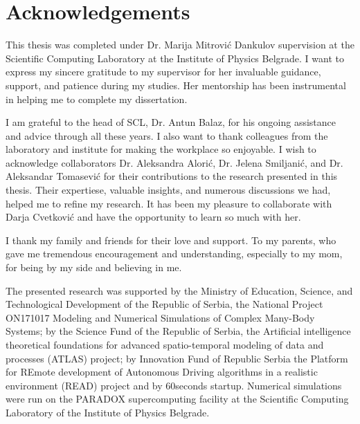 
\normalsize
\chapter{Acknowledgements}

This thesis was completed under Dr. Marija Mitrović Dankulov supervision at the Scientific Computing Laboratory at the Institute of Physics Belgrade. I want to express my sincere gratitude to my supervisor for her invaluable guidance, support, and patience during my studies. Her mentorship has been instrumental in helping me to complete my dissertation.  

I am grateful to the head of SCL, Dr. Antun Balaz, for his ongoing assistance and advice through all these years. I also want to thank colleagues from the laboratory and institute for making the workplace so enjoyable. I wish to acknowledge collaborators Dr. Aleksandra Alorić, Dr. Jelena Smiljanić, and Dr. Aleksandar Tomasević for their contributions to the research presented in this thesis. Their expertiese, valuable insights, and numerous discussions we had, helped me to refine my research. It has been my pleasure to collaborate with Darja Cvetković and have the opportunity to learn so much with her.

I thank my family and friends for their love and support. To my parents, who gave me tremendous encouragement and understanding, especially to my mom, for being by my side and believing in me.

The presented research was supported by the Ministry of Education, Science, and Technological Development of the Republic of Serbia, the National Project ON171017 Modeling and Numerical Simulations of Complex Many-Body Systems; by the Science Fund of the Republic of Serbia, the Artificial intelligence theoretical foundations for advanced spatio-temporal modeling of data and processes (ATLAS) project; by Innovation Fund of Republic Serbia the Platform for REmote development of Autonomous Driving algorithms in a realistic environment (READ) project and by 60seconds startup. Numerical simulations were run on the PARADOX supercomputing facility at the Scientific Computing Laboratory of the Institute of Physics Belgrade.

\hfill

\justify
